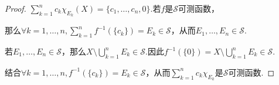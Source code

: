 \begin{proof}
    \(\sum_{k=1}^n c_k \chi_{E_k}(X)=\{c_1, \dots, c_n, 0\}\).若\(f\)是\(\mathcal{S}\)可测函数，

    那么\(\forall k=1, \dots, n, \sum_{k=1}^n f^{-1}(\{c_k\})=E_k \in \mathcal{S}\)，从而\(E_1, \dots, E_n \in \mathcal{S}\).

    若\(E_1, \dots, E_n \in \mathcal{S}\)，那么\(X \setminus \bigcup_{k=1}^n E_k \in \mathcal{S}\).因此\(f^{-1}(\{0\})=X \setminus \bigcup_{k=1}^n E_k \in \mathcal{S}\).

    结合\(\forall k=1, \dots, n, f^{-1}(\{c_k\})=E_k \in \mathcal{S}\)，从而\(\sum_{k=1}^n c_k \chi_{E_k}\)是\(\mathcal{S}\)可测函数.
\end{proof}

\begin{comment}
    \begin{problem}[14]\label{2.B.14}
        考虑函数列\(f_1, f_2, \dots: X \to \mathbb{R}\)，证明：
        \begin{align*}
            \{x \in X: \lim_{k \to \infty} f_k(x)\text{存在}\}
            =\bigcap_{n=1}^\infty \bigcup_{j=1}^\infty \bigcap_{k=j}^\infty (f_k-f_j)^{-1}((-1/n, 1/n))
        \end{align*}
    \end{problem}

    \begin{proof}
        若\(x \in \bigcap_{n=1}^\infty \bigcup_{j=1}^\infty \bigcap_{k=j}^\infty (f_k-f_j)^{-1}((-1/n, 1/n))\)，给定\(\forall \varepsilon>0\)，那么\(\exists n \in \mathbb{N}, 1/n<\varepsilon\).

        则\(\exists n,j \in \mathbb{N}, \forall k \geq j, \abs*{f_k(x)-f_j(x)}<1/n<\varepsilon\)，于是\(f_1(x), f_2(x), \dots\)是柯西序列.

        根据{\kaishu 实数的完备性}，\(f_1(x), f_2(x), \dots\)在\(\mathbb{R}\)中必收敛，也即\(\lim_{k \to \infty}f_k(x)\)存在.

        设\(\lim_{k \to \infty}f_k(x)=c\)，那么\(\forall n \in \mathbb{N}, \exists j \in \mathbb{N}, \forall k \geq j, \abs*{f_k(x)-c}<1/2n\).

        则\(\forall n \in \mathbb{N}, \exists j,k \in \mathbb{N}, \abs*{f_k(x)-f_j(x)} \leq \abs*{f_k(x)-c}+\abs*{f_j(x)-c}< 1/2n+1/2n<1/n\).
        
        即\(x \in \bigcap_{n=1}^\infty \bigcup_{j=1}^\infty \bigcap_{k=j}^\infty (f_k-f_j)^{-1}((-1/n, 1/n))\).
    \end{proof}
\end{comment}

